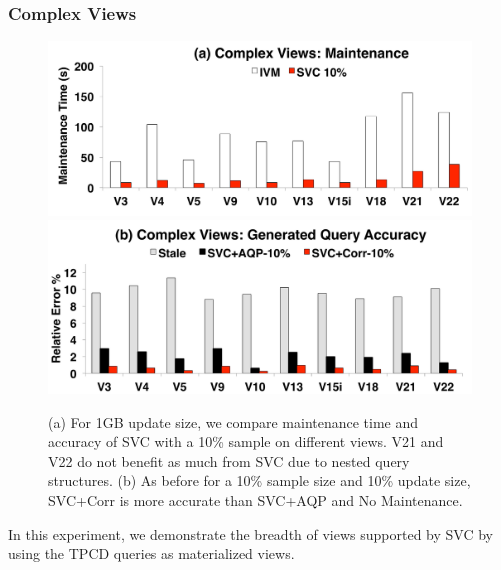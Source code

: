 \subsubsection{Complex Views}

\begin{figure}[t]\vspace{-2em}
\centering
 \includegraphics[scale=0.10]{exp/msqv_1.pdf}
 \includegraphics[scale=0.10]{exp/msqv_2.pdf}\vspace{-1em}
 \caption{(a) For 1GB update size, we compare maintenance time and accuracy of SVC with a 10\% sample on different views. V21 and V22 do not benefit as much from SVC due to nested query structures. (b) As before for a 10\% sample size and 10\% update size, SVC+Corr is more accurate than SVC+AQP and No Maintenance.  \label{exp3-acc}}
\end{figure}
In this experiment, we demonstrate the breadth of views supported by SVC by using the TPCD queries as materialized views.

